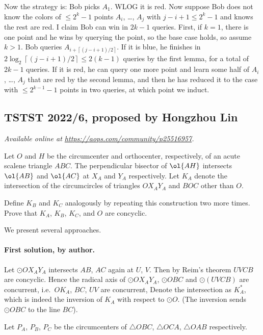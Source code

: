 \documentclass[11pt]{scrartcl}
\begin{document}
Now the strategy is: Bob picks $A_1$. WLOG it is red.
Now suppose Bob does not know the colors of $\le 2^k-1$ points
$A_i$, \dots, $A_j$ with $j-i+1\le 2^k-1$ and knows the rest are red.
I claim Bob can win in $2k-1$ queries.
First, if $k=1$, there is one point and he wins by querying the point,
so the base case holds, so assume $k>1$.
Bob queries $A_{i+\left\lceil (j-i+1)/2 \right\rceil}$.
If it is blue, he finishes in $2\log_2{\left\lceil (j-i+1)/2 \right\rceil} \le 2(k-1)$
queries by the first lemma, for a total of $2k-1$ queries.
If it is red, he can query one more point and learn some half
of $A_i$, \dots, $A_j$ that are red by the second lemma,
and then he has reduced it to the case with $\le 2^{k-1}-1$ points
in two queries, at which point we induct.
\pagebreak

\subsection{TSTST 2022/6, proposed by Hongzhou Lin}
\textsl{Available online at \url{https://aops.com/community/p25516957}.}
\begin{mdframed}[style=mdpurplebox,frametitle={Problem statement}]
Let $O$ and $H$ be the circumcenter and orthocenter,
respectively, of an acute scalene triangle $ABC$.
The perpendicular bisector of $\ol{AH}$ intersects
$\ol{AB}$ and $\ol{AC}$ at $X_A$ and $Y_A$ respectively.
Let $K_A$ denote the intersection of
the circumcircles of triangles $OX_AY_A$ and $BOC$ other than $O$.

Define $K_B$ and $K_C$ analogously by repeating this
construction two more times.
Prove that $K_A$, $K_B$, $K_C$, and $O$ are concyclic.
\end{mdframed}
We present several approaches.

\paragraph{First solution, by author.}
Let $\odot OX_AY_A$ intersects $AB$, $AC$ again at $U$, $V$.
Then by Reim's theorem $UVCB$ are concyclic.
Hence the radical axis of $\odot OX_AY_A$, $\odot OBC$ and $\odot (UVCB)$
are concurrent, i.e.\ $OK_A$, $BC$,  $UV$ are concurrent,
Denote the intersection as $K_A^\ast$,
which is indeed the inversion of $K_A$ with respect to $\odot O$.
(The inversion sends $\odot OBC$ to the line $BC$).

Let $P_A$, $P_B$, $P_C$ be the circumcenters of $\triangle OBC$,
$\triangle OCA$, $\triangle OAB$ respectively.
\end{document}
